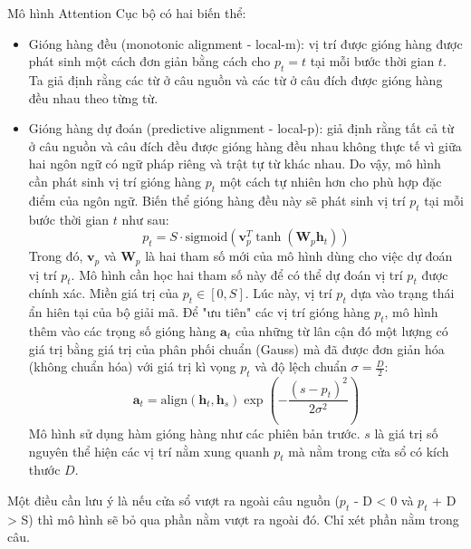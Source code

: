 Mô hình Attention Cục bộ có hai biến thể:
\begin{itemize}
	\item Gióng hàng đều (monotonic alignment - local-m): vị trí được gióng hàng được phát sinh một cách đơn giản bằng cách cho $p_t = t$ tại mỗi bước thời gian $t$. Ta giả định rằng các từ ở câu nguồn và các từ ở câu đích được gióng hàng đều nhau theo từng từ.
	\item Gióng hàng dự đoán (predictive alignment - local-p): giả định rằng tất cả từ ở câu nguồn và câu đích đều được gióng hàng đều nhau không thực tế vì giữa hai ngôn ngữ có ngữ pháp riêng và trật tự từ khác nhau. Do vậy, mô hình cần phát sinh vị trí gióng hàng $p_t$ một cách tự nhiên hơn cho phù hợp đặc điểm của ngôn ngữ. Biến thể gióng hàng đều này sẽ phát sinh vị trí $p_t$ tại mỗi bước thời gian $t$ như sau:
	\begin{equation}
	p_t = S \cdot \text{sigmoid} (\bm{v}^T_p \tanh(\bm{W}_p \bm{h}_t))
	\end{equation}
	Trong đó, $\bm{v}_p$ và $\bm{W}_p$ là hai tham số mới của mô hình dùng cho việc dự đoán vị trí $p_t$. Mô hình cần học hai tham số này để có thể dự đoán vị trí $p_t$ được chính xác. Miền giá trị của $p_t \in [0, S]$. Lúc này, vị trí $p_t$ dựa vào trạng thái ẩn hiên tại của bộ giải mã.
	Để "ưu tiên" các vị trí gióng hàng $p_t$, mô hình thêm vào các trọng số gióng hàng $\bm{a}_t$ của những từ lân cận đó một lượng có giá trị bằng giá trị của phân phối chuẩn (Gauss) mà đã được đơn giản hóa (không chuẩn hóa) với giá trị kì vọng $p_t$ và độ lệch chuẩn $\sigma = \frac{D}{2}$:
	\begin{equation}
	\bm{a}_t = \text{align}(\bm{h}_t, \bm{h}_s)\exp\left(-\frac{(s-p_t)^2}{2\sigma^2}\right)
	\end{equation}
	Mô hình sử dụng hàm gióng hàng như các phiên bản trước. $s$ là giá trị số nguyên thể hiện các vị trí nằm xung quanh $p_t$ mà nằm trong cửa sổ có kích thước $D$.
\end{itemize}

Một điều cần lưu ý là nếu cửa sổ vượt ra ngoài câu nguồn ($p_t$ - D < 0 và $p_t$ + D > S) thì mô hình sẽ bỏ qua phần nằm vượt ra ngoài đó. Chỉ xét phần nằm trong câu.
 
